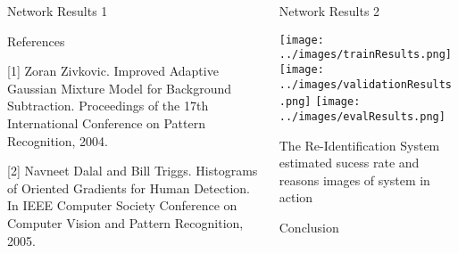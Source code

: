 \documentclass[final]{beamer}
\begin{document}
\begin{frame}{}
\begin{columns}[t]
\begin{column}{.49\linewidth}
        \begin{block}{Network Results 1}
		

        \end{block}
        
        \begin{block}{References}
		\scriptsize
		
[1] Zoran Zivkovic. Improved Adaptive Gaussian Mixture Model for Background Subtraction. Proceedings of the 17th International Conference on Pattern Recognition, 2004.
    
[2] Navneet Dalal and Bill Triggs. Histograms of Oriented Gradients for Human Detection. In IEEE Computer Society Conference on Computer Vision and Pattern Recognition, 2005.
		
    \end{block}
    
    
	 \end{column}
	 \begin{column}{.49\linewidth}
 		\begin{block}{Network Results 2}
 		
 		\texttt{[image: ../images/trainResults.png]}  
 		\hspace{.001cm}
 		\texttt{[image: ../images/validationResults.png]}
 		\hspace{.001cm}
        \texttt{[image: ../images/evalResults.png]}
        \end{block}
        
        \begin{block}{The Re-Identification System}
        estimated sucess rate and reasons
        images of system in action
       
 		\hspace{.7cm}
        
        
        \hspace{.7cm}
        \end{block}
        
       	\begin{block}{Conclusion}

        
        \end{block}

      \end{column}
    \end{columns}
     

  \end{frame}
\end{document}
